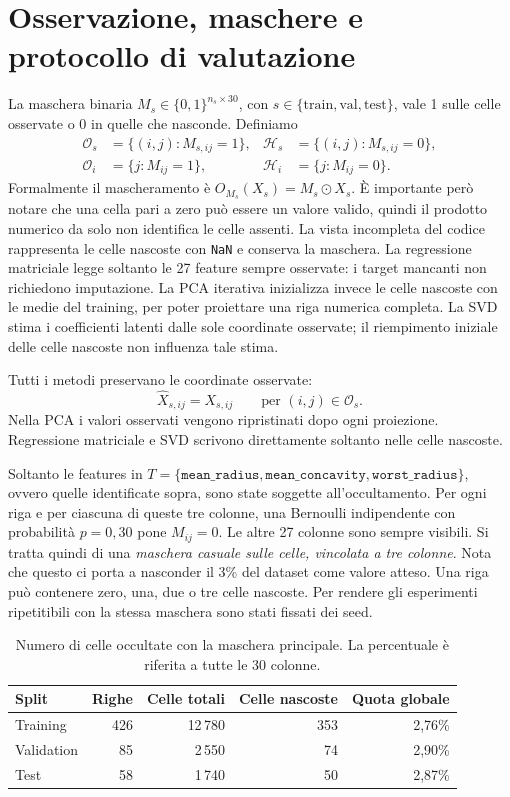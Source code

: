 \documentclass[10pt,a4paper]{article}
\newcommand{\Obs}{\mathcal O}
\newcommand{\Hidden}{\mathcal H}
\newcommand{\feat}[1]{\texttt{#1}}
\begin{document}
\section{Osservazione, maschere e protocollo di valutazione}
La maschera binaria $M_s\in\{0,1\}^{n_s\times30}$, con $s\in\{\mathrm{train,val,test}\}$, 
vale 1 sulle celle osservate o 0 in quelle che nasconde. Definiamo
\begin{align*}
\Obs_s&=\{(i,j):M_{s,ij}=1\},&
\Hidden_s&=\{(i,j):M_{s,ij}=0\},\\
\Obs_i&=\{j:M_{ij}=1\},&
\Hidden_i&=\{j:M_{ij}=0\}.
\end{align*}
Formalmente il mascheramento è $O_{M_s}(X_s)=M_s\odot X_s$. È importante però notare che una cella pari a zero può 
essere un valore valido, quindi il prodotto numerico da solo non identifica le celle assenti. 
La vista incompleta del codice rappresenta le celle nascoste con \feat{NaN} e conserva la maschera. La regressione matriciale legge soltanto le 27 feature sempre osservate: i target mancanti non richiedono imputazione. La PCA iterativa inizializza invece le celle nascoste con le medie del training, per poter proiettare una riga numerica completa. La SVD stima i coefficienti latenti dalle sole coordinate osservate; il riempimento iniziale delle celle nascoste non influenza tale stima.

Tutti i metodi preservano le coordinate osservate:
\[
\widehat X_{s,ij}=X_{s,ij}\qquad\text{per }(i,j)\in\Obs_s.
\]
Nella PCA i valori osservati vengono ripristinati dopo ogni proiezione. Regressione matriciale e SVD scrivono direttamente soltanto nelle celle nascoste.

Soltanto le features in $T=\{\feat{mean\_radius},\feat{mean\_concavity},\feat{worst\_radius}\}$, ovvero quelle identificate sopra, sono state soggette all'occultamento. 
Per ogni riga e per ciascuna di queste tre colonne, una Bernoulli indipendente con probabilità $p=0,30$ pone $M_{ij}=0$. 
Le altre 27 colonne sono sempre visibili. Si tratta quindi di una \emph{maschera casuale sulle celle, vincolata a 
tre colonne}. Nota che questo ci porta a nasconder il 3\% del dataset come valore atteso. Una riga 
può contenere zero, una, due o tre celle nascoste. Per rendere gli esperimenti ripetitibili con la stessa maschera
sono stati fissati dei seed.

\begin{table}[ht]
\centering\small
\caption{Numero di celle occultate con la maschera principale. La percentuale è riferita a tutte le 30 colonne.}
\label{tab:masks}
\begin{tabular}{@{}lrrrr@{}}
\toprule
Split & Righe & Celle totali & Celle nascoste & Quota globale \\
\midrule
Training & 426 & 12\,780 & 353 & 2,76\% \\
Validation & 85 & 2\,550 & 74 & 2,90\% \\
Test & 58 & 1\,740 & 50 & 2,87\% \\
\bottomrule
\end{tabular}
\end{table}
\end{document}
